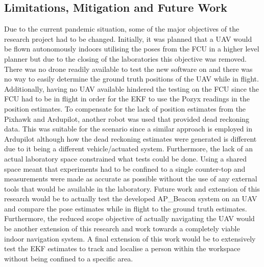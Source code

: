 \subsection{Limitations, Mitigation and Future Work}\label{sec:limitations,-mitigations-and-future-work}
Due to the current pandemic situation, some of the major objectives of the research project had to be changed.
Initially, it was planned that a UAV would be flown autonomously indoors utilising the poses from the FCU in a higher level planner but due to the closing of the laboratories this objective was removed.
There was no drone readily available to test the new software on and there was no way to easily determine the ground truth positions of the UAV while in flight.
Additionally, having no UAV available hindered the testing on the FCU since the FCU had to be in flight in order for the EKF to use the Pozyx readings in the position estimates.
To compensate for the lack of position estimates from the Pixhawk and Ardupilot, another robot was used that provided dead reckoning data.
This was suitable for the scenario since a similar approach is employed in Ardupilot although how the dead reckoning estimates were generated is different due to it being a different vehicle/actuated system.
Furthermore, the lack of an actual laboratory space constrained what tests could be done.
Using a shared space meant that experiments had to be confined to a single counter-top and measurements were made as accurate as possible without the use of any external tools that would be available in the laboratory.
Future work and extension of this research would be to actually test the developed AP\_Beacon system on an UAV and compare the pose estimates while in flight to the ground truth estimates.
Furthermore, the reduced scope objective of actually navigating the UAV would be another extension of this research and work towards a completely viable indoor navigation system.
A final extension of this work would be to extensively test the EKF estimates to track and localise a person within the workspace without being confined to a specific area.
